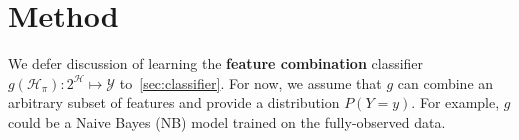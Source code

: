 \section{Method}\label{sec:clf_method}

We defer discussion of learning the \textbf{feature combination} classifier $g(\mathcal{H}_\pi) : 2^\mathcal{H} \mapsto \mathcal{Y}$ to~\autoref{sec:classifier}.
For now, we assume that $g$ can combine an arbitrary subset of features and provide a distribution $P(Y = y)$.
For example, $g$ could be a Naive Bayes (NB) model trained on the fully-observed data.









% 

